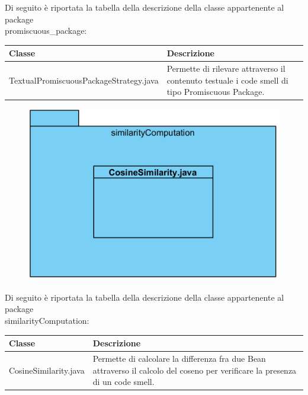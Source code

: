\documentclass[11pt]{article}
\begin{document}
\begin{description}
\begin{figure}[!h]
				\end{figure}
				Di seguito è riportata la tabella della descrizione della classe appartenente al package \\promiscuous\_package:
				\item \begin{tabular}{|p{}|p{}|}
					\hline
					\textbf{Classe} & \textbf{Descrizione}\\
					\hline
					TextualPromiscuousPackageStrategy.java & Permette di rilevare attraverso il contenuto testuale i code smell di tipo Promiscuous Package. \\
					\hline
				\end{tabular}
					
				\item[ 2.1.1.2.7 Package similarityComputation] \item \begin{figure}[!h]
					\centering
					\includegraphics{diagrams/SimilarityComputationPackageDiagram}
				\end{figure}
			Di seguito è riportata la tabella della descrizione della classe appartenente al package \\similarityComputation:
				\item \begin{tabular}{|p{}|p{}|}
					\hline
					\textbf{Classe} & \textbf{Descrizione}\\
					\hline
					CosineSimilarity.java & Permette di calcolare la differenza fra due Bean attraverso il calcolo del coseno per verificare la presenza di un code smell. \\
					\hline
				\end{tabular}
		

\end{description}
\end{document}
